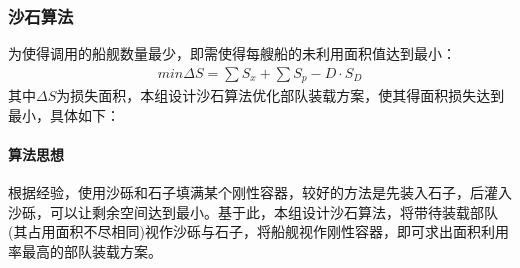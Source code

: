 \documentclass{whutmod}
\begin{document}
	     

		\subsubsection{沙石算法}
	为使得调用的船舰数量最少，即需使得每艘船的未利用面积值达到最小：
	\begin{gather}
	min \Delta S= \sum  S_{x} + \sum  S_{p}-D\cdot S_{D} 
	\end{gather}
	其中$\Delta S$为损失面积，本组设计沙石算法优化部队装载方案，使其得面积损失达到最小，具体如下：
	\paragraph{算法思想}
	根据经验，使用沙砾和石子填满某个刚性容器，较好的方法是先装入石子，后灌入沙砾，可以让剩余空间达到最小。基于此，本组设计沙石算法，将带待装载部队(其占用面积不尽相同)视作沙砾与石子，将船舰视作刚性容器，即可求出面积利用率最高的部队装载方案。
\end{document}
